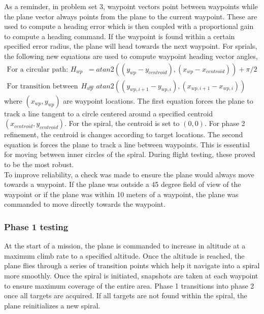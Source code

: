 \documentclass[11pt]{article}
\begin{document}
	As a reminder, in problem set 3, waypoint vectors point between waypoints while the plane vector always points from the plane to the current waypoint. These are used to compute a heading error which is then coupled with a proportional gain to compute a heading command. If the waypoint is found within a certain specified error radius, the plane will head towards the next waypoint. For sprials, the following new equations are used to compute waypoint heading vector angles,
	\begin{align*}
		\mbox{For a circular path: } H_{wp} &= atan2((y_{wp}-y_{centroid}),(x_{wp}-x_{centroid})) + \pi /2 \\
		\mbox{For transition between spirals: } H_{wp} &= atan2((y_{wp,i+1}-y_{wp,i}),(x_{wp,i+1}-x_{wp,i}))
	\end{align*}
	where $(x_{wp},y_{wp})$ are waypoint locations. The first equation forces the plane to track a line tangent to a circle centered around a specified centroid $(x_{centroid},y_{centroid})$. For the spiral, the centroid is set to $(0,0)$. For phase 2 refinement, the centroid is changes according to target locations. The second equation is forces the plane to track a line between waypoints. This is essential for moving between inner circles of the spiral. During flight testing, these proved to be the most robust.\\

	To improve reliability, a check was made to ensure the plane would always move towards a waypoint. If the plane was outside a 45 degree field of view of the waypoint or if the plane was within 10 meters of a waypoint, the plane was commanded to move directly towards the waypoint.

	\subsubsection{Phase 1 testing}
	At the start of a mission, the plane is commanded to increase in altitude at a maximum climb rate to a specified altitude. Once the altitude is reached, the plane flies through a series of transition points which help it navigate into a spiral more smoothly. Once the spiral is initiated, snapshots are taken at each waypoint to ensure maximum coverage of the entire area. Phase 1 transitions into phase 2 once all targets are acquired. If all targets are not found within the spiral, the plane reinitializes a new spiral.\\
\end{document}
